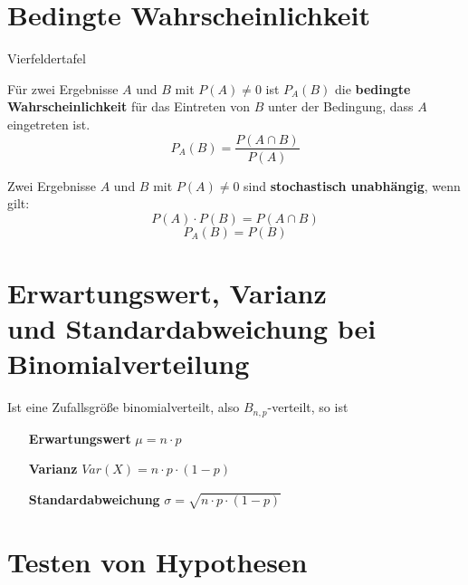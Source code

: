 \documentclass[10pt]{article}
\begin{document}
\section{Bedingte Wahrscheinlichkeit}
\begin{margintable}
\centering
{}
\caption{Vierfeldertafel}
\end{margintable}


\begin{definition}
	Für zwei Ergebnisse $A$ und $B$ mit $P(A)\neq 0$ ist $P_A(B)$ die \textbf{bedingte Wahrscheinlichkeit} für das Eintreten von $B$ unter der Bedingung, dass $A$ eingetreten ist.
	\[
	P_A(B)=\frac{P(A\cap B)}{P(A)}
	\]
\end{definition}
\begin{definition}
	Zwei Ergebnisse $A$ und $B$ mit $P(A)\neq 0$ sind \textbf{stochastisch unabhängig}, wenn gilt:
	\[
	P(A)\cdot P(B)=P(A\cap B)
	\]
	\[
	P_A(B)=P(B)
	\]
\end{definition}

\section{Erwartungswert, Varianz\\ und Standardabweichung bei Binomialverteilung}
\begin{definition}
Ist eine Zufallsgröße binomialverteilt, also $B_{n,p}$-verteilt, so ist
	\begin{itemize}[leftmargin=6pt+]
	\item[\bfseries Erwartungswert] $\mu = n\cdot p$
	\item[\bfseries Varianz] $Var(X)=n\cdot p\cdot (1-p)$
	\item[\bfseries Standardabweichung] $\sigma=\sqrt{n\cdot p\cdot (1-p)}$
	\end{itemize}
\end{definition}

\section{Testen von Hypothesen}
\newpage
\end{document}
